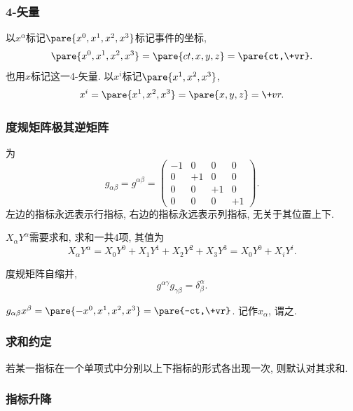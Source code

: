 \documentclass[hidelinks]{ctexart}
\begin{document}
\subsubsection{4-矢量} %
\label{ssub:4_矢量}

以$x^\alpha$标记$\pare{x^0,x^1,x^2,x^3}$标记事件的坐标,
\[ \pare{x^0,x^1,x^2,x^3} = \pare{ct,x,y,z} = \pare{ct,\+vr}. \]
也用$x$标记这一4-矢量. 以$x^i$标记$\pare{x^1,x^2,x^3}$,
\[ x^i = \pare{x^1,x^2,x^3} = \pare{x,y,z} = \+vr. \]


\subsubsection{度规矩阵极其逆矩阵} %
\label{ssub:度规矩阵极其逆矩阵}

为
\[ g_{\alpha\beta} = g^{\alpha\beta} = \begin{pmatrix}
    -1 & 0 & 0 & 0 \\
    0 & +1 & 0 & 0 \\
    0 & 0 & +1 & 0 \\
    0 & 0 & 0 & +1
\end{pmatrix}. \]
左边的指标永远表示行指标, 右边的指标永远表示列指标, 无关于其位置上下.
\begin{ex}
    $X_\alpha Y^\alpha$需要求和, 求和一共$4$项, 其值为
    \[ X_\alpha Y^\alpha = X_0Y^0 + X_1Y^1 + X_2Y^2 + X_3Y^3 = X_0Y^0 + X_i Y^i. \]
\end{ex}
\begin{ex}
    度规矩阵自缩并,
    \[ g^{\alpha\gamma}g_{\gamma\beta} = \delta^{\alpha}_{\beta}. \]
\end{ex}
$g_{\alpha\beta}x^\beta = \pare{-x^0,x^1,x^2,x^3} = \pare{-ct,\+vr}$. 记作$x_\alpha$, 谓之.


\subsubsection{求和约定} %
\label{ssub:求和约定}

若某一指标在一个单项式中分别以上下指标的形式各出现一次, 则默认对其求和.


\subsubsection{指标升降} %
\label{ssub:指标升降}
\end{document}
